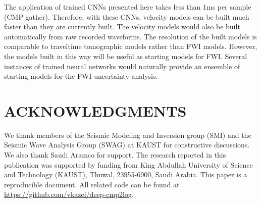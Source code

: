 \documentclass[manuscript]{geophysics}
\begin{document}
The application of trained CNNs presented here takes less than 1ms per sample (CMP gather). Therefore, with these CNNs, velocity models can be built much faster than they are currently built. The velocity models would also be built automatically from raw recorded waveforms. The resolution of the built models is comparable to traveltime tomographic models rather than FWI models. However, the models built in this way will be useful as starting models for FWI. Several instances of trained neural networks would naturally provide an ensemble of starting models for the FWI uncertainty analysis. 

\section{ACKNOWLEDGMENTS}

We thank members of the Seismic Modeling and Inversion group (SMI) and the Seismic Wave Analysis Group (SWAG) at KAUST for constructive discussions. We also thank Saudi Aramco for support.
The research reported in this publication was supported by funding from King Abdullah University of Science and Technology (KAUST), Thuwal, 23955-6900, Saudi Arabia.
%
This paper is a reproducible document. All related code can be found at \href{https://github.com/vkazei/deep-cmp2log}{https://github.com/vkazei/deep-cmp2log}.




\newpage


\end{document}
